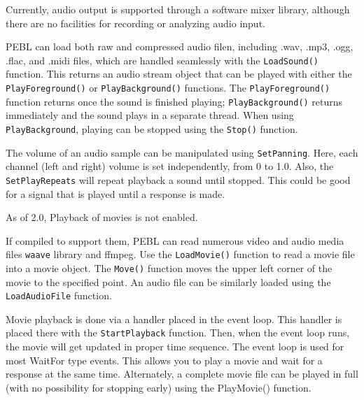 \newpage
{}

Currently, audio output is supported through a software mixer library, although there are no facilities for recording or analyzing audio input.

PEBL can load both raw and compressed audio filen, including .wav, .mp3, .ogg, .flac, and .midi files, which are handled seamlessly with the \texttt{LoadSound()} function. This returns an audio stream object that can be played  with either the \texttt{PlayForeground()}  or \texttt{PlayBackground()} functions.  
The \texttt{PlayForeground()} function returns once the sound is finished playing; \texttt{PlayBackground()} returns immediately and the sound plays in a separate thread.  When using \texttt{PlayBackground}, playing can be stopped using the \texttt{Stop()} function.

The volume of an audio sample can be manipulated using \texttt{SetPanning}. Here, each channel (left and right) volume is set independently, from 0 to 1.0.  Also, the \texttt{SetPlayRepeats} will repeat playback a sound until stopped. This could be good for a signal that is played until a response is made.






As of 2.0, Playback of movies is not enabled.

If compiled to support them, PEBL can read numerous video and audio
media files \texttt{waave} library and ffmpeg.  Use the
\texttt{LoadMovie()} function to read a movie file into a movie
object.  The \texttt{Move()} function moves the upper left corner of the movie to the
specified point.  An audio file can be similarly loaded using the \texttt{LoadAudioFile} function.

Movie playback is done via a handler placed in the event loop.  This handler is placed there with the \texttt{StartPlayback} function.  Then, when the event loop runs, the movie will get updated in proper time sequence.  The event loop is used for most WaitFor type events.  This allows you to play a movie and wait for a response at the same time.  Alternately, a complete movie file can be played in full (with no possibility for stopping early) using the PlayMovie() function.

